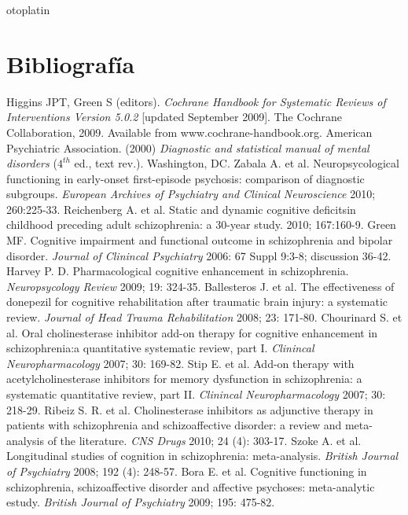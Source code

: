 otoplatin\documentclass[a4paper,openright,12pt]{report}
\begin{document}
\chapter{Bibliografía}\label{cap.bibliografía}
\begin{thebibliography}{99}
 Higgins JPT, Green S (editors). \textit{Cochrane Handbook for Systematic Reviews of Interventions Version 5.0.2} [updated September 2009]. The Cochrane Collaboration, 2009. Available from www.cochrane-handbook.org.
 American Psychiatric Association. (2000) \textit{Diagnostic and statistical manual of mental disorders} ($4^{th}$ ed., text rev.). Washington, DC.
 Zabala A. et al. Neuropsycological functioning in early-onset first-episode psychosis: comparison of diagnostic subgroups. \textit{European Archives of Psychiatry and Clinical Neuroscience} 2010; 260:225-33.
 Reichenberg A. et al. Static and dynamic cognitive deficitsin childhood preceding adult schizophrenia: a 30-year study.  2010; 167:160-9.
 Green MF. Cognitive impairment and functional outcome in schizophrenia and bipolar disorder. \textit{Journal of Clinincal Psychiatry} 2006: 67 Suppl 9:3-8; discussion 36-42.
 Harvey P. D. Pharmacological cognitive enhancement in schizophrenia. \textit{Neuropsycology Review} 2009; 19: 324-35.
 Ballesteros J. et al. The effectiveness of donepezil for cognitive rehabilitation after traumatic brain injury: a systematic review. \textit{Journal of Head Trauma Rehabilitation} 2008; 23: 171-80.
 Chourinard S. et al. Oral cholinesterase inhibitor add-on therapy for cognitive enhancement in schizophrenia:a quantitative systematic review, part I. \textit{Clinincal Neuropharmacology} 2007; 30: 169-82.
 Stip E. et al. Add-on therapy with acetylcholinesterase inhibitors for memory dysfunction in schizophrenia: a systematic quantitative review, part II. \textit{Clinincal Neuropharmacology} 2007; 30: 218-29.
 Ribeiz S. R. et al. Cholinesterase inhibitors as adjunctive therapy in patients with schizophrenia and schizoaffective disorder: a review and meta-analysis of the literature. \textit{CNS Drugs}  2010; 24 (4): 303-17.
 Szoke A. et al. Longitudinal studies of cognition in schizophrenia: meta-analysis. \textit{British Journal of Psychiatry} 2008; 192 (4): 248-57.
 Bora E. et al. Cognitive functioning in schizophrenia, schizoaffective disorder and affective psychoses: meta-analytic estudy. \textit{British Journal of Psychiatry} 2009; 195: 475-82.

\end{thebibliography}
\end{document}
